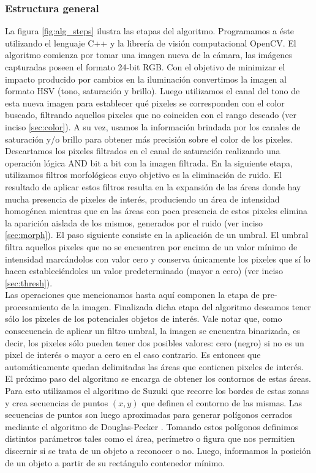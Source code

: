 \subsubsection{Estructura general}
La figura \ref{fig:alg_steps} ilustra las etapas del algoritmo. 
Programamos a \'este utilizando el lenguaje C++ y la librer\'ia de 
visi\'on computacional OpenCV.
El algoritmo comienza por tomar una imagen nueva de la c\'amara, las 
im\'agenes capturadas poseen el formato 24-bit RGB. Con el objetivo de 
minimizar el impacto producido por cambios en la iluminaci\'on 
convertimos la imagen al formato HSV (tono, saturaci\'on y brillo). Luego 
utilizamos el canal del tono de esta nueva imagen para establecer qu\'e 
pixeles se corresponden con el color buscado, filtrando aquellos 
pixeles que no coinciden con el rango deseado (ver inciso 
\ref{sec:color}). A su vez, usamos la informaci\'on brindada por los  canales de saturaci\'on y/o brillo para obtener m\'as precisi\'on sobre el color de los pixeles.\\
	\indent Descartamos los pixeles filtrados en el canal de saturaci\'on 
	realizando una operaci\'on l\'ogica AND bit a bit con la imagen filtrada.  En la siguiente 
	etapa, utilizamos filtros morfol\'ogicos cuyo objetivo es la 
	eliminaci\'on de ruido. El resultado de aplicar estos filtros resulta 
	en la expansi\'on de las \'areas donde hay mucha presencia de pixeles de 
	inter\'es, produciendo un \'area de intensidad homog\'enea mientras que 
	en las \'areas con poca presencia de estos pixeles 
	elimina la aparici\'on aislada de los mismos, generados por el ruido (ver 
	inciso \ref{sec:morph}). El paso 
	siguiente consiste en la aplicaci\'on de un umbral. El umbral filtra 
	aquellos pixeles que no se encuentren por encima de un valor m\'inimo 
	de intensidad marc\'andolos con valor cero y conserva \'unicamente los 
	pixeles que s\'i lo hacen estableci\'endoles un valor predeterminado 
	(mayor a cero) (ver inciso \ref{sec:thresh}). \\
	\indent Las operaciones que mencionamos hasta aqu\'i componen la 
	etapa de  pre-procesamiento de la imagen. Finalizada dicha etapa del 
	algoritmo deseamos tener s\'olo los pixeles de los potenciales objetos de 
	inter\'es. Vale notar que, como consecuencia de aplicar un filtro 
	umbral, la imagen se encuentra binarizada, es decir, los pixeles s\'olo 
	pueden tener dos posibles valores: cero (negro) si no es un pixel de 
	inter\'es o mayor a cero en el caso contrario. Es entonces que 
	autom\'aticamente quedan delimitadas las \'areas que contienen pixeles 
	de inter\'es. El pr\'oximo paso del algoritmo se encarga de obtener los 
	contornos de estas \'areas. Para esto utilizamos el algoritmo de Suzuki 
	\cite{suzuki85} que recorre los bordes de estas zonas y crea 
	secuencias de puntos $(x,y)$ que definen el contorno de las mismas. 
	Las secuencias de puntos son luego aproximadas para generar pol\'igonos 
	cerrados mediante el algoritmo de Douglas-Pecker \cite{dp74}. Tomando 
	estos pol\'igonos definimos distintos par\'ametros tales como el \'area, 
	per\'imetro o figura que nos permitien discernir si se trata de un objeto 
	a reconocer o no. Luego, informamos la posici\'on de un objeto a 
	partir de su rect\'angulo contenedor m\'inimo.


